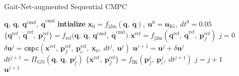 \begin{algorithm}[h!]
\caption{Gait-Net-augmented Sequential CMPC}
\label{alg:gaitMPC}
\begin{algorithmic}[1]
\Require $\mathbf q, \: \dot{\mathbf q}, \: \mathbf q^\text{cmd}, \: \dot{\mathbf q}^\text{cmd}$
\State \textbf{intialize} $\bm x_0 = f_\text{j2m}(\mathbf q, \: \dot{\mathbf q}), \: \bm u^0 =\bm u_\text{IG}, \: dt^0 = 0.05$ 
\State $\{ \mathbf q^\text{ref},\:\dot{\mathbf q}^\text{ref},\:\bm p_f^\text{ref}\} = f_\text{ref} \big(\mathbf q, \: \dot{\mathbf q}, \: \mathbf q^\text{cmd}, \: \dot{\mathbf q}^\text{cmd} \big)$
\State $\bm x^\text{ref} = f_\text{j2m}(\mathbf q^\text{ref},\:\dot{\mathbf q}^\text{ref},\:\bm p_f^\text{ref})$
\State $ j = 0$ 
\State $\delta \bm u^{j} = \texttt{cmpc}(\bm x^\text{ref},\:\bm p_f^\text{ref},\:\bm p_c^\text{ref},\: \bm x_0,\: dt^j, \: \bm u^j)$
\State $\bm u^{j+1} = \bm u^j + \delta \bm u^j$ 
\State $dt^{j+1} = \Pi_\text{GN}(\mathbf q, \: \dot{\mathbf q},\: \bm p_f^{j})$
\State $\{ \bm x^\text{ref},\:\bm p_f^\text{ref}\}= f_\text{IK}(\bm p_f^{j},\:\bm p_c^{j},\: dt^{j+1})$
\State $j=j+1$
\EndWhile \\
\Return $\bm u^{j+1} $
\end{algorithmic}
\end{algorithm}